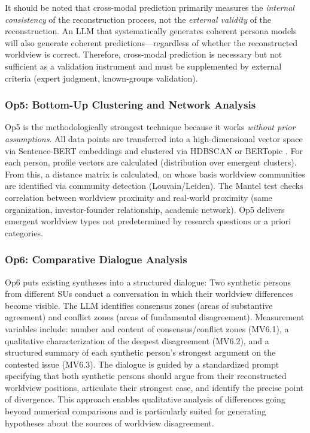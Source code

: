 \documentclass[11pt,a4paper]{article}
\theoremstyle{definition}
\theoremstyle{plain}
\theoremstyle{remark}
\begin{document}
It should be noted that cross-modal prediction primarily measures the \emph{internal consistency} of the reconstruction process, not the \emph{external validity} of the reconstruction. An LLM that systematically generates coherent persona models will also generate coherent predictions---regardless of whether the reconstructed worldview is correct. Therefore, cross-modal prediction is necessary but not sufficient as a validation instrument and must be supplemented by external criteria (expert judgment, known-groups validation).

\subsubsection{Op5: Bottom-Up Clustering and Network Analysis}

Op5 is the methodologically strongest technique because it works \emph{without prior assumptions}. All data points are transferred into a high-dimensional vector space via Sentence-BERT embeddings \citep{Reimers2019} and clustered via HDBSCAN \citep{McInnes2017} or BERTopic \citep{Grootendorst2022}. For each person, profile vectors are calculated (distribution over emergent clusters). From this, a distance matrix is calculated, on whose basis worldview communities are identified via community detection (Louvain/Leiden). The Mantel test checks correlation between worldview proximity and real-world proximity (same organization, investor-founder relationship, academic network). Op5 delivers emergent worldview types not predetermined by research questions or a priori categories.

\subsubsection{Op6: Comparative Dialogue Analysis}

Op6 puts existing syntheses into a structured dialogue: Two synthetic persons from different SUs conduct a conversation in which their worldview differences become visible. The LLM identifies consensus zones (areas of substantive agreement) and conflict zones (areas of fundamental disagreement). Measurement variables include: number and content of consensus/conflict zones (MV6.1), a qualitative characterization of the deepest disagreement (MV6.2), and a structured summary of each synthetic person's strongest argument on the contested issue (MV6.3). The dialogue is guided by a standardized prompt specifying that both synthetic persons should argue from their reconstructed worldview positions, articulate their strongest case, and identify the precise point of divergence. This approach enables qualitative analysis of differences going beyond numerical comparisons and is particularly suited for generating hypotheses about the sources of worldview disagreement.
\end{document}
